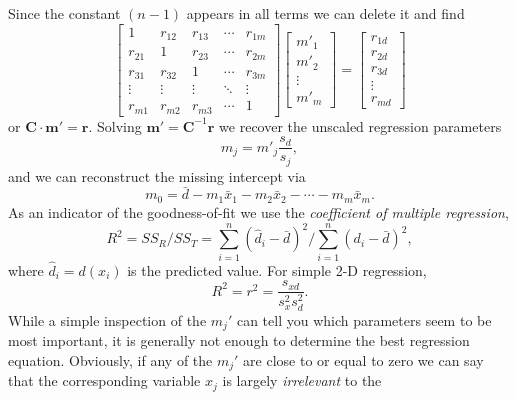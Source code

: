 Since the constant $(n-1)$ appears in all terms we can delete it and find
\begin{equation}
\left [ \begin{array}{ccccc}
1 & r_{12} & r_{13} & \cdots & r_{1m} \\
r_{21} & 1 & r_{23} &  \cdots & r_{2m} \\
r_{31} & r_{32} & 1 &  \cdots & r_{3m} \\
\vdots & \vdots & \vdots & \ddots & \vdots \\
r_{m1} & r_{m2} & r_{m3} & \cdots & 1 \end{array} \right ]
\left [
\begin{array}{c}
m'_1 \\ m'_2 \\ \vdots \\ m'_m \end{array} \right ] =
\left [ \begin{array}{c}
r_{1d} \\ r_{2d} \\ r_{3d} \\ \vdots \\ r_{md}
\end{array} \right ]
\end{equation}	 	
or $\mathbf{C} \cdot \mathbf{m'} = \mathbf{r}$.  Solving $\mathbf{m' = C}^{-1}\mathbf{r}$ we recover the unscaled regression parameters
\begin{equation}
m_j = m'_j \frac{s_d}{s_j},
\end{equation}	 
and we can reconstruct the missing intercept via
\begin{equation}
m_0 = \bar{d} - m_1 \bar{x}_1 - m_2 \bar{x}_2 - \cdots - m_m \bar{x}_m.
\end{equation}	 
As an indicator of the goodness-of-fit we use the \emph{coefficient of multiple regression},
\begin{equation}
R^2 = SS_R/SS_T = \sum^n_{i=1} (\hat{d}_i - \bar{d})^2 / \sum^n_{i=1} (d_i - \bar{d})^2,
\end{equation}	 
where $\hat{d}_i = d(x_i)$ is the predicted value.  For simple 2-D regression,
\begin{equation}
R^2 = r^2 = \frac{s_{xd}}{s^2_x s^2_d}.
\end{equation}	 
	While a simple inspection of the $m_j'$ can tell you which parameters seem to be most important, 
it is generally not enough to determine the best regression equation.  Obviously, if any of the $m_j'$ 
are close to or equal to zero we can say that the corresponding variable $x_j$ is largely \emph{irrelevant} to the 
